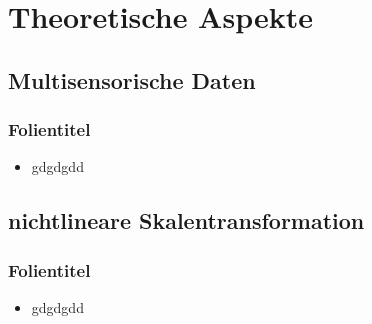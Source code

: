 \section{Theoretische Aspekte}

\subsection{Multisensorische Daten}
\begin{frame}\frametitle{Folientitel}
  \begin{itemize}[<+-| alert@+>]
  \item  gdgdgdd
\end{itemize}
\end{frame}

\subsection{nichtlineare Skalentransformation}
\begin{frame}\frametitle{Folientitel}
  \begin{itemize}[<+-| alert@+>]
  \item  gdgdgdd
\end{itemize}
\end{frame}

